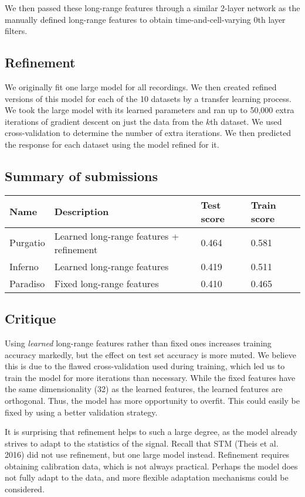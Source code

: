 \documentclass[]{article}
\begin{document}
We then passed these long-range features through a similar 2-layer
network as the manually defined long-range features to obtain
time-and-cell-varying \(0\)th layer filters.

\subsection{Refinement}\label{refinement}

We originally fit one large model for all recordings. We then created
refined versions of this model for each of the 10 datasets by a transfer
learning process. We took the large model with its learned parameters
and ran up to 50,000 extra iterations of gradient descent on just the
data from the \(k\)th dataset. We used cross-validation to determine the
number of extra iterations. We then predicted the response for each
dataset using the model refined for it.

\subsection{Summary of submissions}\label{summary-of-submissions}

\begin{longtable}[c]{@{}llll@{}}
\toprule
Name & Description & Test score & Train score\tabularnewline
\midrule
\endhead
Purgatio & Learned long-range features + refinement & 0.464 &
0.581\tabularnewline
Inferno & Learned long-range features & 0.419 & 0.511\tabularnewline
Paradiso & Fixed long-range features & 0.410 & 0.465\tabularnewline
\bottomrule
\end{longtable}

\subsection{Critique}\label{critique}

Using \emph{learned} long-range features rather than fixed ones
increases training accuracy markedly, but the effect on test set
accuracy is more muted. We believe this is due to the flawed
cross-validation used during training, which led us to train the model
for more iterations than necessary. While the fixed features have the
same dimensionality (32) as the learned features, the learned features
are orthogonal. Thus, the model has more opportunity to overfit. This
could easily be fixed by using a better validation strategy.

It is surprising that refinement helps to such a large degree, as the
model already strives to adapt to the statistics of the signal. Recall
that STM (Theis et al. 2016) did not use refinement, but one large model
instead. Refinement requires obtaining calibration data, which is not
always practical. Perhaps the model does not fully adapt to the data,
and more flexible adaptation mechanisms could be considered.
\end{document}
